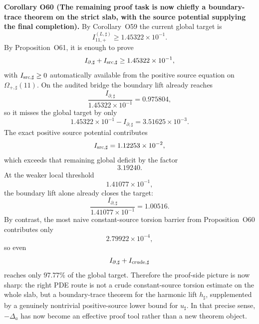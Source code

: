 \documentclass[aps,prd,onecolumn,notitlepage,nofootinbib,superscriptaddress,11pt,floatfix]{revtex4-2}
\begin{document}
\medskip\noindent\textbf{Corollary O60 (The remaining proof task is now chiefly a boundary-trace theorem on the strict slab, with the source potential supplying the final completion).}
By Corollary~O59 the current global target is
\[
I_{11,+}^{(L,\sharp)}\ge 1.45322\times10^{-1}.
\]
By Proposition~O61, it is enough to prove
\[
I_{\partial,\sharp}+I_{{\rm src},\sharp}\ge 1.45322\times10^{-1},
\]
with \(I_{{\rm src},\sharp}\ge 0\) automatically available from the positive source equation on \(\Omega_{+,\sharp}(11)\).  On the audited bridge the boundary lift already reaches
\[
\frac{I_{\partial,\sharp}}{1.45322\times10^{-1}}=0.975804,
\]
so it misses the global target by only
\[
1.45322\times10^{-1}-I_{\partial,\sharp}
=
3.51625\times10^{-3}.
\]
The exact positive source potential contributes
\[
I_{{\rm src},\sharp}=1.12253\times10^{-2},
\]
which exceeds that remaining global deficit by the factor
\[
3.19240.
\]
At the weaker local threshold
\[
1.41077\times10^{-1},
\]
the boundary lift alone already closes the target:
\[
\frac{I_{\partial,\sharp}}{1.41077\times10^{-1}}=1.00516.
\]
By contrast, the most naive constant-source torsion barrier from Proposition~O60 contributes only
\[
2.79922\times10^{-4},
\]
so even
\[
I_{\partial,\sharp}+I_{{\rm crude},\sharp}
\]
reaches only \(97.77\%\) of the global target.  Therefore the proof-side picture is now sharp: the right PDE route is not a crude constant-source torsion estimate on the whole slab, but a boundary-trace theorem for the harmonic lift \(h_\sharp\), supplemented by a genuinely nontrivial positive-source lower bound for \(u_\sharp\).  In that precise sense, \(-\Delta_a\) has now become an effective proof tool rather than a new theorem object.
\end{document}

